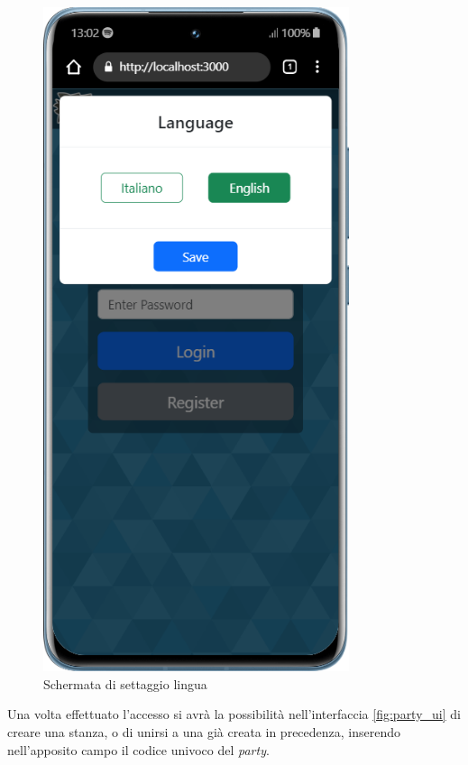 \begin{figure}[H]
    \centering
    \begin{minipage}{0.45\textwidth}
        \centering
        \includegraphics[width=0.8\textwidth]{img/screen/mobile/language_mobile.png}
    \end{minipage}
    \caption{Schermata di settaggio lingua}
    \label{fig:language_ui}
\end{figure}

Una volta effettuato l'accesso si avrà la possibilità nell'interfaccia \ref{fig:party_ui} di creare una stanza, o di unirsi a una già creata in precedenza, inserendo nell'apposito campo il codice univoco del \emph{party}.

